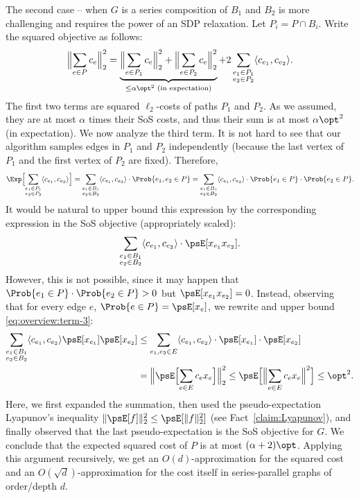 \documentclass[11pt,a4paper]{article}
\begin{document}
The second case -- when $G$ is a series composition of $B_1$ and $B_2$ is more challenging and requires the power of an SDP relaxation. Let $P_i = P\cap B_i$. Write the squared objective as follows:
\begin{equation}\label{eq:overview:cost}\Bigl\|\sum_{e\in P} c_e\Bigr\|_2^2 = \underbrace{\Bigl\|\sum_{e\in P_1} c_e\Bigr\|_2^2 + \Bigl\|\sum_{e\in P_2} c_e\Bigr\|_2^2}_{\leq \alpha \opt^2 \text{ (in expectation)}} + 2\sum_{\substack{e_1\in P_1\\e_2\in P_2}} \langle c_{e_1},c_{e_2}\rangle.
\end{equation}
The first two terms are squared $\ell_2$-costs of paths $P_1$ and $P_2$. As we assumed, they are at most $\alpha$ times their SoS costs, and thus their sum is at most $\alpha \opt^2$ (in expectation). We now analyze the third term. It is not hard to see that our algorithm samples edges in $P_1$ and $P_2$ independently (because the last vertex of $P_1$ and the first vertex of $P_2$ are fixed). Therefore, 
\begin{equation}\label{eq:overview:term-3}
\Exp\Bigl[\sum_{\substack{e_1\in P_1\\e_2\in P_2}} \langle c_{e_1},c_{e_2}\rangle\Bigr] = \sum_{\substack{e_1\in B_1\\e_2\in B_2}} \langle c_{e_1},c_{e_2}\rangle \cdot \Prob{e_1,e_2\in P}=
\sum_{\substack{e_1\in B_1\\e_2\in B_2}} \langle c_{e_1},c_{e_2}\rangle \cdot \Prob{e_1\in P} \cdot \Prob{e_2\in P}.
\end{equation}
It would be natural to upper bound this expression by the corresponding expression in the SoS objective (appropriately scaled):
\[
 \sum_{\substack{e_1\in B_1\\e_2\in B_2}} \langle c_{e_1},c_{e_2}\rangle \cdot \psE[x_{e_1}x_{e_2}].\]
However, this is not possible, since it may happen that  
$\Prob{e_1\in P}\cdot \Prob{e_2\in P} > 0 $ but $\psE[x_{e_1}x_{e_2}] = 0$. Instead, observing that for every edge $e$, $\Prob{e\in P} = \psE[x_e]$, we rewrite and upper bound \eqref{eq:overview:term-3}:
\begin{align*}
\sum_{\substack{e_1\in B_1\\e_2\in B_2}} \langle c_{e_1},c_{e_2}\rangle  \psE[x_{e_1}] \psE[x_{e_2}]
&\leq 
\sum_{e_1,e_2\in E} \langle c_{e_1},c_{e_2}\rangle \cdot \psE[x_{e_1}] \cdot \psE[x_{e_2}]
\\
&=\Bigl\|\psE\Bigl[\sum_{e\in E}c_{e}x_{e}\Bigr]\Bigr\|_2^2
\leq \psE\Bigl[\Bigl\|\sum_{e\in E} c_e x_e\Bigr\|^2\Bigr]\leq \opt^2.
\end{align*}
Here, we first expanded the summation, then used the pseudo-expectation Lyapunov's inequality $\|\psE[f]\|_2^2 \leq \psE[\|f\|_2^2]$ (see Fact~\ref{claim:Lyapunov}), and finally observed that the last pseudo-expectation is the SoS objective for $G$.
We conclude that the expected squared cost of $P$ is at most $(\alpha+2) \opt$.
Applying this argument recursively, we get an $O(d)$-approximation for the squared cost and an $O(\sqrt{d})$-approximation for the cost itself in series-parallel graphs of order/depth $d$.
\end{document}

